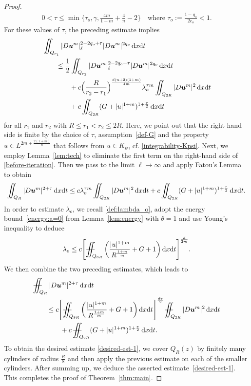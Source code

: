 \documentclass[a4paper, 10pt, american]{amsart}
\numberwithin{theorem}{section}
\numberwithin{equation}{section}
\newcommand{\dxdt}{\,\mathrm{d}x\mathrm{d}t}
\newcommand{\power}[2]{\bm{#1^{\mbox{\unboldmath{\scriptsize$#2$}}}}}
\def\Xiint#1{\mathchoice
    {\XXiint\displaystyle\textstyle{#1}}%
    {\XXiint\textstyle\scriptstyle{#1}}%
    {\XXiint\scriptstyle\scriptscriptstyle{#1}}%
    {\XXiint\scriptscriptstyle\scriptscriptstyle{#1}}%
    \!\iint}
\def\XXiint#1#2#3{\setbox0=\hbox{$#1{#2#3}{\iint}$}
    \vcenter{\hbox{$#2#3$}}\kern-0.5\wd0}
\def\biint{\Xiint{-\!-}}
\begin{document}
\begin{proof}
\begin{align*}
0<\tau\le\min\Big\{\tau_o,\gamma, \frac{4m}{1+m}+\frac4n-2\Big\}
\quad\mbox{where $\tau_o:=\frac{1-q_o}{2c_o}<1.$}
\end{align*}
For these values of $\tau$, the preceding estimate implies 
\begin{align}\label{before-iteration}\nonumber
&\iint_{Q_{r_1}}|D\power um|_\ell^{2-2q_o+\tau}|D\power um|^{2q_o}\dxdt\\
&\qquad\le
\frac12\iint_{Q_{r_2}}|D\power um|_\ell^{2-2q_o+\tau}|D\power um|^{2q_o}\dxdt\nonumber\\
&\qquad\qquad+
c\Big(\frac{R}{r_2-r_1}\Big)^{\frac{d(n+2)(1+m)}{4m}}\lambda_o^{\tau m}\iint_{Q_{2R}}|D\power um|^2\dxdt\nonumber\\
&\qquad\qquad+
c\iint_{Q_{2R}}(G+|u|^{1+m})^{1+\frac\tau2}\dxdt
\end{align}
for all $r_1$ and $r_2$ with $R\le r_1<r_2\le 2R$.
Here, we point out that the right-hand side is finite by the choice of
$\tau$, assumption~\eqref{def-G} and the property
$u\in L^{2m+\frac{2(1+m)}n}$ that follows from $u\in K_\psi$, cf. \eqref{integrability-Kpsi}.
Next, we employ Lemma~\ref{lem:tech} to eliminate the first term on
the right-hand side of \eqref{before-iteration}. Then we pass to the
limit $\ell\rightarrow \infty$ and apply Fatou's Lemma to obtain
\begin{align*}
\iint_{Q_{R}}|D\power um|^{2+\tau}\dxdt
\le
c\lambda_o^{\tau m}\iint_{Q_{2R}}|D\power um|^2\dxdt
+
c\iint_{Q_{2R}}(G+|u|^{1+m})^{1+\frac\tau2}\dxdt.
\end{align*}
In order to estimate $\lambda_o$, we recall \eqref{def:lambda_o},
adopt the energy bound~\eqref{energy:a=0} from Lemma~\ref{lem:energy} with $\theta=1$ and use Young's inequality to deduce
\begin{align*}
\lambda_o
\le
c\Bigg[ \biint_{Q_{8R}} \bigg(\frac{|u|^{1+m}}{R^\frac{1+m}m}+G+1\bigg)\dxdt\Bigg]^\frac{d}{2m}.
\end{align*}
We then combine the two preceding estimates, which leads to
\begin{align*}
&\biint_{Q_{R}}|D\power um|^{2+\tau}\dxdt\\
&\qquad\le
c\Bigg[ \biint_{Q_{8R}} \bigg(\frac{|u|^{1+m}}{R^\frac{1+m}m}+G+1\bigg)\dxdt\Bigg]^\frac{d\tau }{2} \biint_{Q_{2R}}|D\power um|^2\dxdt\\
&\qquad\qquad+
c\,\biint_{Q_{2R}}(G+|u|^{1+m})^{1+\frac\tau2}\dxdt.
\end{align*}
To obtain the desired estimate \eqref{desired-est-1}, we cover
$Q_R(z)$ by finitely many cylinders of radius $\frac{R}8$ and then apply the
previous estimate on each of the smaller cylinders. After summing up, we
deduce the asserted estimate~\eqref{desired-est-1}. This completes the
proof of Theorem~\ref{thm:main}.
\end{proof}
\end{document}
